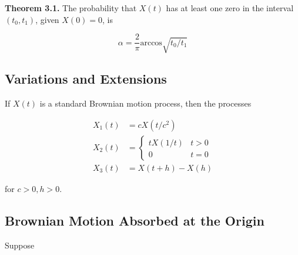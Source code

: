 \documentclass[12pt]{article}
\theoremstyle{nonumberbreak}
\begin{document}
\begin{theorem}
\textbf{Theorem 3.1.} The probability that $X(t)$ has at least one zero in the interval $(t_0, t_1)$, given $X(0) = 0$, is

$$
\alpha = \frac{2}{\pi} \mathrm{arccos} \sqrt{t_0/t_1}
$$
\end{theorem}


\subsection{Variations and Extensions}

If $X(t)$ is a standard Brownian motion process, then the processes 

$$
\begin{aligned}
X_1(t) &= c X(t/c^2) \\[8pt]
X_2(t) &= \begin{cases}
t X(1/t) & t>0 \\
0 & t=0
\end{cases} \\[8pt]
X_3(t) &= X(t+h) - X(h) 
\end{aligned}
$$

for $c>0, h>0$.  




\subsection{Brownian Motion Absorbed at the Origin}

Suppose
\end{document}
